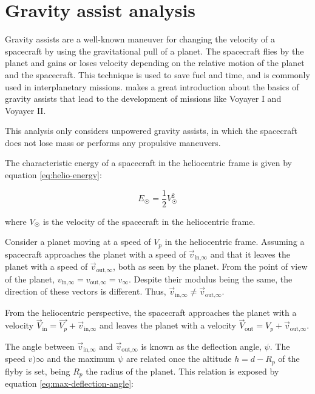 \section{Gravity assist analysis}
\label{sec:gravity-assist-analysis}

Gravity assists are a well-known maneuver for changing the velocity of a
spacecraft by using the gravitational pull of a planet. The spacecraft flies by
the planet and gains or loses velocity depending on the relative motion of the
planet and the spacecraft. This technique is used to save fuel and time, and is
commonly used in interplanetary missions. \cite{flandro1966} makes a great
introduction about the basics of gravity assists that lead to the development of
missions like Voyayer I and Voyayer II.

This analysis only considers unpowered gravity assists, in which the spacecraft
does not lose mass or performs any propulsive maneuvers.


The characteristic energy of a spacecraft in the heliocentric frame is given by
equation \ref{eq:helio-energy}:

\begin{equation}
  E_{\Sun} = \frac{1}{2}V_{\Sun}^2
  \label{eq:helio-energy}
\end{equation}

where $V_{\Sun}$ is the velocity of the spacecraft in the heliocentric frame.

Consider a planet moving at a speed of $V_p$ in the heliocentric frame. Assuming
a spacecraft approaches the planet with a speed of $\vec{v}_{\text{in,}\infty}$
and that it leaves the planet with a speed of $\vec{v}_{\text{out,}\infty}$,
both as seen by the planet. From the point of view of the planet,
$v_{\text{in,}\infty} = v_{\text{out,}\infty} = v_{\infty}$. Despite their
modulus being the same, the direction of these vectors is different. Thus,
$\vec{v}_{\text{in,}\infty} \neq \vec{v}_{\text{out,}\infty}$.

From the heliocentric perspective, the spacecraft approaches the planet with a
velocity $\vec{V}_{\text{in}} = \vec{V_p} + \vec{v}_{\text{in,}\infty}$ and
leaves the planet with a velocity $\vec{V}_{\text{out}} = V_p +
  \vec{v}_{\text{out,}\infty}$.

The angle between $\vec{v}_{\text{in,}\infty}$ and $\vec{v}_{\text{out,}\infty}$
is known as the deflection angle, $\psi$. The speed $v){\infty}$ and the maximum
$\psi$ are related once the altitude $h = d - R_p$ of the flyby is set, being
$R_p$ the radius of the planet. This relation is exposed by equation
\ref{eq:max-deflection-angle}:

